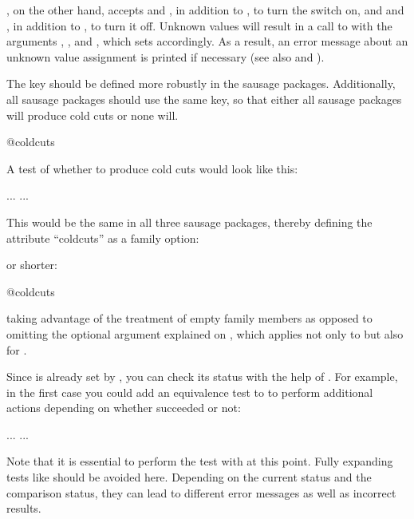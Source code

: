 , on the other hand, accepts  and
, in addition to , to turn the switch on, and
 and , in addition to , to turn it off.
Unknown values will result in a call to
 with the arguments
, , and , which sets
 accordingly. As a result, an error
message about an unknown value assignment is printed if necessary (see also
 and
).
\begin{Example}
  The key  should be defined more robustly in the sausage
  packages. Additionally, all sausage packages should use the same key, so
  that either all sausage packages will produce cold cuts or none will.
\begin{lstcode}
                         {@coldcuts}
\end{lstcode}
  A test of whether to produce cold cuts would look like this:
\begin{lstcode}
  \if@coldcuts
     ...
  \else
     ...
  \fi
\end{lstcode}
  This would be the same in all three sausage packages, thereby
  defining the attribute ``coldcuts'' as a family option:
  or shorter:
\begin{lstcode}
                           {@coldcuts}
\end{lstcode}
  taking advantage of the treatment of empty family members as opposed to
  omitting the optional argument explained on
  , which applies not only
  to  but also for
  .

  Since  is already set by
  , you can check its status with the help of
  . For example, in the first case you
  could add an equivalence test to  to perform additional
  actions depending on whether  succeeded or not:
  \begin{lstcode}
    \ifx\FamilyKeyState\FamilyKeyStateProcessed
        ...
    \else
        ...
    \fi   
  \end{lstcode}
  Note that it is essential to perform the test with
   at this point. Fully expanding tests like  should
  be avoided here. Depending on the current status and the comparison status,
  they can lead to different error messages as well as incorrect results.
\end{Example}
%
\EndIndexGroup


